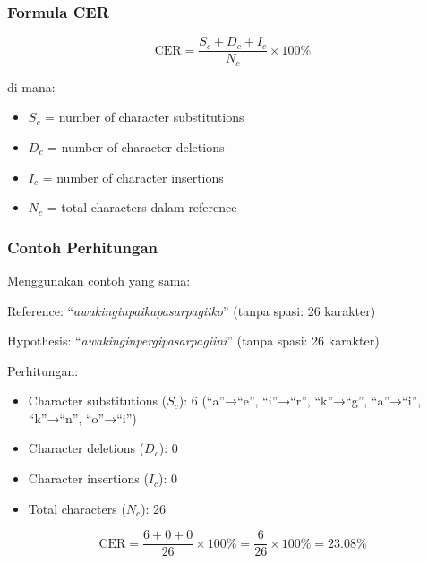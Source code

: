 \subsubsection{Formula CER}

\vspace{0.3cm}
\begin{equation}
\label{eq:cer_def}
\text{CER} = \frac{S_c + D_c + I_c}{N_c} \times 100\%
\end{equation}
\vspace{0.2cm}

\noindent
di mana:
\begin{itemize}[noitemsep]
    \item $S_c$ = number of character substitutions
    \item $D_c$ = number of character deletions
    \item $I_c$ = number of character insertions
    \item $N_c$ = total characters dalam reference
\end{itemize}

\subsubsection{Contoh Perhitungan}

Menggunakan contoh yang sama:

Reference: ``\textit{awakinginpaikapasarpagiiko}'' (tanpa spasi: 26 karakter)

Hypothesis: ``\textit{awakinginpergipasarpagiini}'' (tanpa spasi: 26 karakter)

Perhitungan:
\begin{itemize}[noitemsep]
    \item Character substitutions ($S_c$): 6 (``a''→``e'', ``i''→``r'', ``k''→``g'', ``a''→``i'', ``k''→``n'', ``o''→``i'')
    \item Character deletions ($D_c$): 0
    \item Character insertions ($I_c$): 0
    \item Total characters ($N_c$): 26
\end{itemize}

\vspace{0.3cm}
\begin{equation}
\label{eq:cer_example}
\text{CER} = \frac{6 + 0 + 0}{26} \times 100\% = \frac{6}{26} \times 100\% = 23.08\%
\end{equation}
\vspace{0.2cm}

